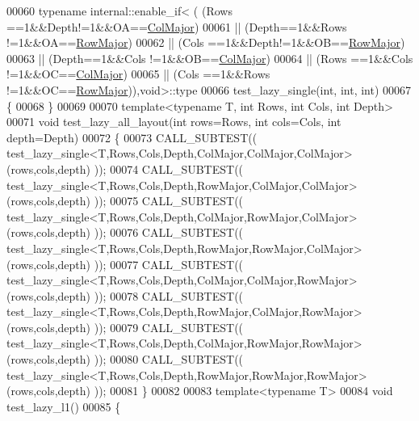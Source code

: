 \begin{DoxyCode}
00060 \textcolor{keyword}{typename} internal::enable\_if<  ( (Rows ==1&&Depth!=1&&OA==\hyperlink{group__enums_ggaacded1a18ae58b0f554751f6cdf9eb13a0cbd4bdd0abcfc0224c5fcb5e4f6669a}{ColMajor})
00061                               || (Depth==1&&Rows !=1&&OA==\hyperlink{group__enums_ggaacded1a18ae58b0f554751f6cdf9eb13acfcde9cd8677c5f7caf6bd603666aae3}{RowMajor})
00062                               || (Cols ==1&&Depth!=1&&OB==\hyperlink{group__enums_ggaacded1a18ae58b0f554751f6cdf9eb13acfcde9cd8677c5f7caf6bd603666aae3}{RowMajor})
00063                               || (Depth==1&&Cols !=1&&OB==\hyperlink{group__enums_ggaacded1a18ae58b0f554751f6cdf9eb13a0cbd4bdd0abcfc0224c5fcb5e4f6669a}{ColMajor})
00064                               || (Rows ==1&&Cols !=1&&OC==\hyperlink{group__enums_ggaacded1a18ae58b0f554751f6cdf9eb13a0cbd4bdd0abcfc0224c5fcb5e4f6669a}{ColMajor})
00065                               || (Cols ==1&&Rows !=1&&OC==\hyperlink{group__enums_ggaacded1a18ae58b0f554751f6cdf9eb13acfcde9cd8677c5f7caf6bd603666aae3}{RowMajor})),\textcolor{keywordtype}{void}>::type
00066 test\_lazy\_single(\textcolor{keywordtype}{int}, \textcolor{keywordtype}{int}, \textcolor{keywordtype}{int})
00067 \{
00068 \}
00069 
00070 \textcolor{keyword}{template}<\textcolor{keyword}{typename} T, \textcolor{keywordtype}{int} Rows, \textcolor{keywordtype}{int} Cols, \textcolor{keywordtype}{int} Depth>
00071 \textcolor{keywordtype}{void} test\_lazy\_all\_layout(\textcolor{keywordtype}{int} rows=Rows, \textcolor{keywordtype}{int} cols=Cols, \textcolor{keywordtype}{int} depth=Depth)
00072 \{
00073   CALL\_SUBTEST(( test\_lazy\_single<T,Rows,Cols,Depth,ColMajor,ColMajor,ColMajor>(rows,cols,depth) ));
00074   CALL\_SUBTEST(( test\_lazy\_single<T,Rows,Cols,Depth,RowMajor,ColMajor,ColMajor>(rows,cols,depth) ));
00075   CALL\_SUBTEST(( test\_lazy\_single<T,Rows,Cols,Depth,ColMajor,RowMajor,ColMajor>(rows,cols,depth) ));
00076   CALL\_SUBTEST(( test\_lazy\_single<T,Rows,Cols,Depth,RowMajor,RowMajor,ColMajor>(rows,cols,depth) ));
00077   CALL\_SUBTEST(( test\_lazy\_single<T,Rows,Cols,Depth,ColMajor,ColMajor,RowMajor>(rows,cols,depth) ));
00078   CALL\_SUBTEST(( test\_lazy\_single<T,Rows,Cols,Depth,RowMajor,ColMajor,RowMajor>(rows,cols,depth) ));
00079   CALL\_SUBTEST(( test\_lazy\_single<T,Rows,Cols,Depth,ColMajor,RowMajor,RowMajor>(rows,cols,depth) ));
00080   CALL\_SUBTEST(( test\_lazy\_single<T,Rows,Cols,Depth,RowMajor,RowMajor,RowMajor>(rows,cols,depth) ));
00081 \}
00082 
00083 \textcolor{keyword}{template}<\textcolor{keyword}{typename} T>
00084 \textcolor{keywordtype}{void} test\_lazy\_l1()
00085 \{

\end{DoxyCode}
